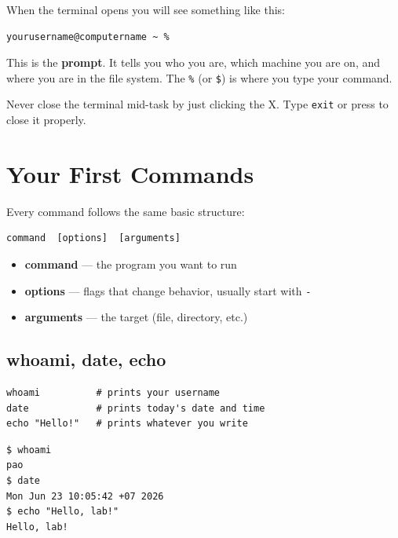 \documentclass[12pt,a4paper]{article}
\newcommand{\warn}[1]{%
  \begin{tcolorbox}[warnstyle]
    #1
  \end{tcolorbox}
}
\newcommand{\cmd}[1]{\texttt{\textcolor{kugreen!70!black}{#1}}}
\newcommand{\key}[1]{\fbox{\small\ttfamily #1}}
\begin{document}
When the terminal opens you will see something like this:

\begin{lstlisting}[style=terminal]
yourusername@computername ~ %
\end{lstlisting}

This is the \textbf{prompt}. It tells you who you are, which machine you are
on, and where you are in the file system. The \texttt{\%} (or \texttt{\$}) is
where you type your command.

\warn{
  Never close the terminal mid-task by just clicking the X. Type \cmd{exit}
  or press \key{Ctrl+D} to close it properly.
}

\section{Your First Commands}

Every command follows the same basic structure:

\begin{lstlisting}[style=code]
command  [options]  [arguments]
\end{lstlisting}

\begin{itemize}
  \item \textbf{command} --- the program you want to run
  \item \textbf{options} --- flags that change behavior, usually start with \texttt{-}
  \item \textbf{arguments} --- the target (file, directory, etc.)
\end{itemize}

\subsection{whoami, date, echo}

\begin{lstlisting}[style=bash]
whoami          # prints your username
date            # prints today's date and time
echo "Hello!"   # prints whatever you write
\end{lstlisting}

\begin{lstlisting}[style=terminal]
$ whoami
pao
$ date
Mon Jun 23 10:05:42 +07 2026
$ echo "Hello, lab!"
Hello, lab!
\end{lstlisting}
\end{document}

